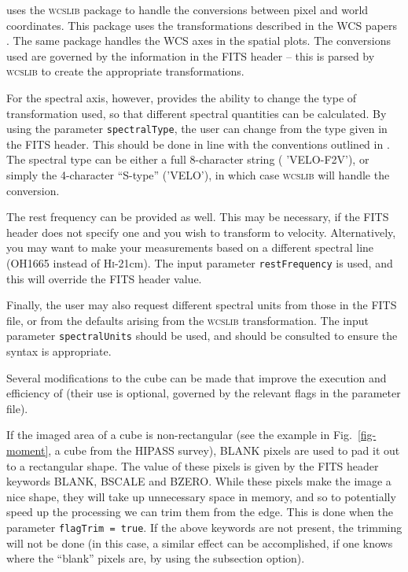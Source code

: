 \label{sec-wcs}

\duchamp uses the \textsc{wcslib} package to handle the conversions
between pixel and world coordinates. This package uses the
transformations described in the WCS papers
\citep{greisen02,calabretta02,greisen06}. The same package handles the
WCS axes in the spatial plots. The conversions used are governed by
the information in the FITS header -- this is parsed by
\textsc{wcslib} to create the appropriate transformations.

For the spectral axis, however, \duchamp provides the ability to change the
type of transformation used, so that different spectral quantities can
be calculated. By using the parameter \texttt{spectralType}, the user
can change from the type given in the FITS header. This should be done
in line with the conventions outlined in \citet{greisen06}. The
spectral type can be either a full 8-character string (\eg
'VELO-F2V'), or simply the 4-character ``S-type'' (\eg 'VELO'), in
which case \textsc{wcslib} will handle the conversion.

The rest frequency can be provided as well. This may be necessary, if
the FITS header does not specify one and you wish to transform to
velocity. Alternatively, you may want to make your measurements based
on a different spectral line (\eg OH1665 instead of
H\textsc{i}-21cm). The input parameter \texttt{restFrequency} is used,
and this will override the FITS header value.

Finally, the user may also request different spectral units from those
in the FITS file, or from the defaults arising from the
\textsc{wcslib} transformation. The input parameter
\texttt{spectralUnits} should be used, and \citet{greisen02} should be
consulted to ensure the syntax is appropriate.

\label{sec-modify}

Several modifications to the cube can be made that improve the
execution and efficiency of \duchamp (their use is optional, governed
by the relevant flags in the parameter file).

\label{sec-blank}

If the imaged area of a cube is non-rectangular (see the example in
Fig.~\ref{fig-moment}, a cube from the HIPASS survey), BLANK pixels
are used to pad it out to a rectangular shape. The value of these
pixels is given by the FITS header keywords BLANK, BSCALE and
BZERO. While these pixels make the image a nice shape, they will take
up unnecessary space in memory, and so to potentially speed up the
processing we can trim them from the edge. This is done when the
parameter \texttt{flagTrim = true}. If the above keywords are not
present, the trimming will not be done (in this case, a similar effect
can be accomplished, if one knows where the ``blank'' pixels are, by
using the subsection option).

